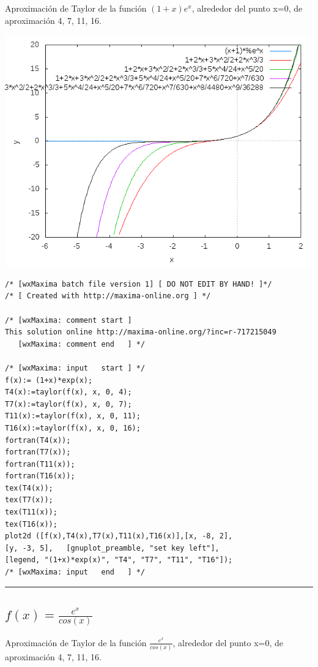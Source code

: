 \documentclass{article}
\begin{document}
Aproximaci\'on de Taylor de la funci\'on $(1+x)e^x$, alrededor del punto  x=0, de aproximaci\'on 4, 7, 11, 16.

\includegraphics[scale=.5]{(1+x)(exp(x))}

\begin{Verbatim}[frame=single]
/* [wxMaxima batch file version 1] [ DO NOT EDIT BY HAND! ]*/
/* [ Created with http://maxima-online.org ] */

/* [wxMaxima: comment start ]
This solution online http://maxima-online.org/?inc=r-717215049
   [wxMaxima: comment end   ] */

/* [wxMaxima: input   start ] */
f(x):= (1+x)*exp(x);
T4(x):=taylor(f(x), x, 0, 4);
T7(x):=taylor(f(x), x, 0, 7);
T11(x):=taylor(f(x), x, 0, 11);
T16(x):=taylor(f(x), x, 0, 16);
fortran(T4(x));
fortran(T7(x));
fortran(T11(x));
fortran(T16(x));
tex(T4(x));
tex(T7(x));
tex(T11(x));
tex(T16(x));
plot2d ([f(x),T4(x),T7(x),T11(x),T16(x)],[x, -8, 2],
[y, -3, 5],   [gnuplot_preamble, "set key left"],
[legend, "(1+x)*exp(x)", "T4", "T7", "T11", "T16"]);
/* [wxMaxima: input   end   ] */
\end{Verbatim}



\noindent\rule{\textwidth}{1pt}


\subsection{$f(x)= \frac{e^x}{cos(x)}$}

Aproximaci\'on de Taylor de la funci\'on $\frac{e^x}{cos(x)}$, alrededor del punto  x=0, de aproximaci\'on 4, 7, 11, 16.
\end{document}
